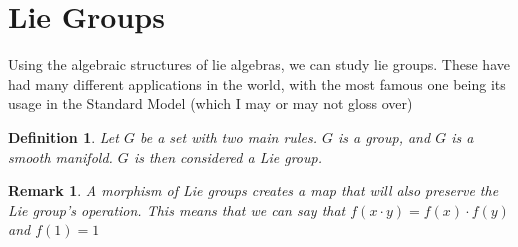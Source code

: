 \documentclass[12pt]{article}
\newtheorem{definition}{Definition}
\newtheorem*{rem}{Remark}
\begin{document}
\section{Lie Groups}
Using the algebraic structures of lie algebras, we can study lie groups. These have had many different applications in the world, with the most famous one being its usage in the Standard Model (which I may or may not gloss over)
\begin{definition}
Let $G$ be a set with two main rules. $G$ is a group, and $G$ is a smooth manifold. $G$ is then considered a Lie group.
\end{definition}	
\begin{rem}
A morphism of Lie groups creates a map that will also preserve the Lie group's operation. This means that we can say that $f(x \cdot y) = f(x) \cdot f(y)$ and $f(1) = 1$
\end{rem}
\end{document}
